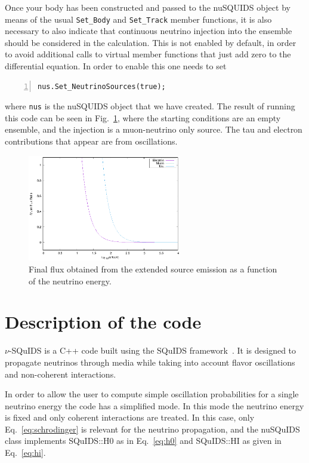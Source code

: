 \documentclass[3p,12pt]{elsarticle}
\newcommand{\ttf}{\ttfamily}
\begin{document}
Once your body has been constructed and passed to the {\ttf nuSQUIDS} object by means of the usual \texttt{Set\_Body} and \texttt{Set\_Track} member functions, it is also necessary to also indicate that continuous neutrino injection into the ensemble should be considered in the calculation.
This is not enabled by default, in order to avoid additional calls to virtual member functions that just add zero to the differential equation.
In order to enable this one needs to set
\begin{lstlisting}[frame=leftline, numbers =
  left,breaklines=true,label = ex:sin1,firstnumber=last]
    nus.Set_NeutrinoSources(true);
\end{lstlisting}
where \texttt{nus} is the {\ttf nuSQUIDS} object that we have created.
The result of running this code can be seen in Fig.~\ref{fig:extended_sources}, where the starting conditions are an empty 
ensemble, and the injection is a muon-neutrino only source. The tau and electron contributions that appear are from oscillations.

\begin{figure}[h!]
  \centering
  \includegraphics[width=0.6\textwidth]{fig/extended_sources.eps}
  \caption{Final flux obtained from the extended source emission as a function of the neutrino energy.}
  \label{fig:extended_sources}
\end{figure}


\section{Description of the code} 
\label{sec:code} 

$\nu$-SQuIDS is a {\ttf C++} code built using the SQuIDS
framework~\citep{SQUIDS}. It is designed to propagate neutrinos
through media while taking into account flavor oscillations and
non-coherent interactions. 

In order to allow the user to compute simple oscillation probabilities
for a single neutrino energy the code has a simplified mode.
In this mode the neutrino energy is fixed and only coherent interactions
are treated.
In this case, only Eq.~\eqref{eq:schrodinger} is relevant for the
neutrino propagation, and the {\ttf nuSQuIDS} class implements {\ttf
  SQuIDS::H0} as in Eq.~\eqref{eq:h0} and {\ttf SQuIDS::HI} as given
in Eq.~\eqref{eq:hi}. 
\end{document}
